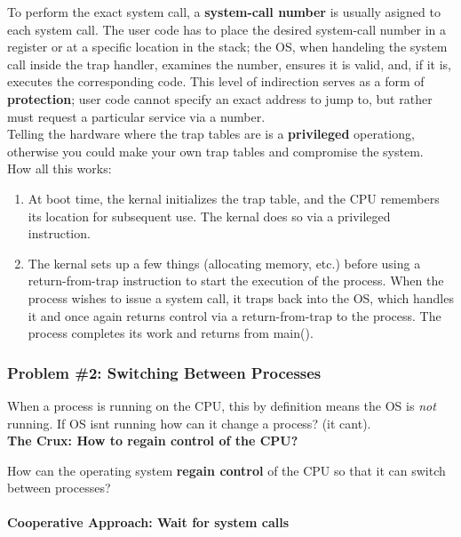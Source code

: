 To perform the exact system call, a \textbf{system-call number} is usually 
asigned to each system call. The user code has to place the desired system-call
number in a register or at a specific location in the stack; the OS, when
handeling the system call inside the trap handler, examines the number,
ensures it is valid, and, if it is, executes the corresponding code. This
level of indirection serves as a form of \textbf{protection}; user code cannot
specify an exact address to jump to, but rather must request a particular 
service via a number.\\

Telling the hardware where the trap tables are is a \textbf{privileged} 
operationg, otherwise you could make your own trap tables and compromise the
system.\\

How all this works:

\begin{enumerate}
    \item At boot time, the kernal initializes the trap table, and the CPU
        remembers its location for subsequent use. The kernal does so via
        a privileged instruction.
    \item The kernal sets up a few things (allocating memory, etc.) before
        using a return-from-trap instruction to start the execution of the 
        process. When the process wishes to issue a system call, it traps back
        into the OS, which handles it and once again returns control via a 
        return-from-trap to the process. The process completes its work and 
        returns from main().
\end{enumerate}

\subsubsection{Problem \#2: Switching Between Processes}

When a process is running on the CPU, this by definition means the OS is
\textit{not} running. If OS isnt running how can
it change a process? (it cant).\\

\textbf{The Crux: How to regain control of the CPU?}

How can the operating system \textbf{regain control} of the CPU so that it can
switch between processes?

\paragraph{Cooperative Approach: Wait for system calls}

